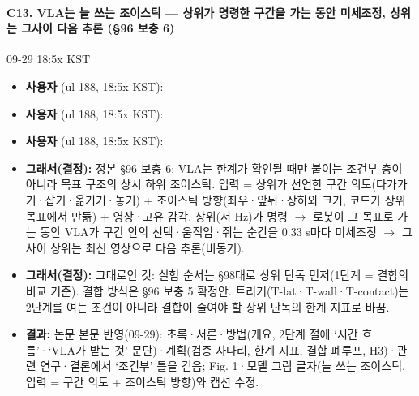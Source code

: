 \paragraph{C13. VLA는 늘 쓰는 조이스틱 --- 상위가 명령한 구간을 가는 동안 미세조정, 상위는 그사이 다음 추론 (§96 보충 6)}
{\small 09-29 18:5x KST}
\begin{itemize}
  \item \textbf{사용자} (ul 188, 18:5x KST): 
  \item \textbf{사용자} (ul 188, 18:5x KST): 
  \item \textbf{사용자} (ul 188, 18:5x KST): 
  \item \textbf{그래서(결정):} 정본 §96 보충 6: VLA는 한계가 확인될 때만 붙이는 조건부 층이 아니라 목표 구조의 상시 하위 조이스틱. 입력 = 상위가 선언한 구간 의도(다가가기·잡기·옮기기·놓기) + 조이스틱 방향(좌우·앞뒤·상하와 크기, 코드가 상위 목표에서 만듦) + 영상·고유 감각. 상위(저 Hz)가 명령 $\rightarrow$ 로봇이 그 목표로 가는 동안 VLA가 구간 안의 선택·움직임·쥐는 순간을 0.33 s마다 미세조정 $\rightarrow$ 그사이 상위는 최신 영상으로 다음 추론(비동기).
  \item \textbf{그래서(결정):} 그대로인 것: 실험 순서는 §98대로 상위 단독 먼저(1단계 = 결합의 비교 기준). 결합 방식은 §96 보충 5 확정안. 트리거(T-lat·T-wall·T-contact)는 2단계를 여는 조건이 아니라 결합이 줄여야 할 상위 단독의 한계 지표로 바꿈.
  \item \textbf{결과:} 논문 본문 반영(09-29): 초록·서론·방법(개요, 2단계 절에 `시간 흐름'·`VLA가 받는 것' 문단)·계획(검증 사다리, 한계 지표, 결합 폐루프, H3)·관련 연구·결론에서 `조건부' 틀을 걷음; Fig. 1·모델 그림 글자(늘 쓰는 조이스틱, 입력 = 구간 의도 + 조이스틱 방향)와 캡션 수정.
\end{itemize}
